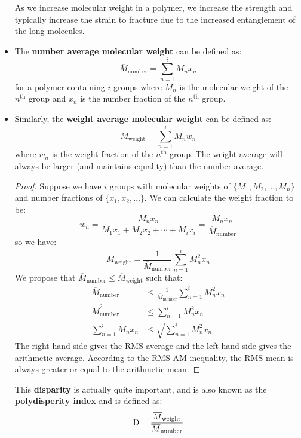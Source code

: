 \begin{itemize}
\begin{case}
        As we increase molecular weight in a polymer, we increase the strength and typically increase the strain to fracture due to the increased entanglement of the long molecules.
    \end{case}
    \item The \textbf{number average molecular weight} can be defined as:
    \begin{equation}
        \overline{M}_\text{number} = \sum_{n=1}^i M_nx_n
    \end{equation}
    for a polymer containing $i$ groups where $M_n$ is the molecular weight of the $n^\text{th}$ group and $x_n$ is the number fraction of the $n^\text{th}$ group.
    \item Similarly, the \textbf{weight average molecular weight} can be defined as:
    \begin{equation}
        \overline{M}_\text{weight} = \sum_{n=1}^i M_nw_n
    \end{equation}
    where $w_n$ is the weight fraction of the $n^\text{th}$ group. The weight average will always be larger (and maintains equality) than the number average.
    \begin{proof}
        Suppose we have $i$ groups with molecular weights of $\{M_1, M_2, \dots, M_n\}$ and number fractions of $\{x_1, x_2, \dots \}$. We can calculate the weight fraction to be:
        \begin{equation}
            w_n = \frac{M_nx_n}{M_1x_1+M_2x_2 + \cdots +M_ix_i} = \frac{M_nx_n}{\overline{M}_\text{number}}
        \end{equation}
        so we have:
        \begin{equation}
            \overline{M}_\text{weight} = \frac{1}{\overline{M}_\text{number}}\sum_{n=1}^i  M^2_nx_n
        \end{equation}
        We propose that $\overline{M}_\text{number} \le \overline{M}_\text{weight}$ such that:
        \begin{align}
            \overline{M}_\text{number} & \le  \frac{1}{\overline{M}_\text{number}}\sum_{n=1}^i  M^2_nx_n \\ 
            \overline{M}^2_\text{number} &\le \sum_{n=1}^iM^2_nx_n \\ 
            \sum_{n=1}^i M_nx_n &\le \sqrt{\sum_{n=1}^i M^2_nx_n}
        \end{align}
        The right hand side gives the RMS average and the left hand side gives the arithmetic average. According to the \href{https://en.wikipedia.org/wiki/HM-GM-AM-QM\_inequalities}{RMS-AM inequality}, the RMS mean is always greater or equal to the arithmetic mean.
    \end{proof}
    This \textbf{disparity} is actually quite important, and is also known as the \textbf{polydisperity index} and is defined as:
    \begin{equation}
        \text{\DJ} = \frac{\overline{M}_\text{weight}}{\overline{M}_\text{number}}
    \end{equation}

\end{itemize}
